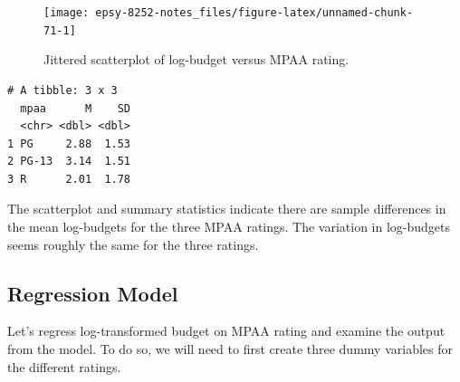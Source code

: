 \documentclass[]{book}
\newenvironment{Shaded}{\begin{snugshade}}{\end{snugshade}}
\newcommand{\CommentTok}[1]{\textcolor[rgb]{0.56,0.35,0.01}{\textit{#1}}}
\newcommand{\DataTypeTok}[1]{\textcolor[rgb]{0.13,0.29,0.53}{#1}}
\newcommand{\KeywordTok}[1]{\textcolor[rgb]{0.13,0.29,0.53}{\textbf{#1}}}
\newcommand{\NormalTok}[1]{#1}
\newcommand{\OperatorTok}[1]{\textcolor[rgb]{0.81,0.36,0.00}{\textbf{#1}}}
\newcommand{\StringTok}[1]{\textcolor[rgb]{0.31,0.60,0.02}{#1}}
\begin{document}
\begin{figure}

{\centering \texttt{[image: epsy-8252-notes\_files/figure-latex/unnamed-chunk-71-1]} 

}

\caption{Jittered scatterplot of log-budget versus MPAA rating.}\label{fig:unnamed-chunk-71}
\end{figure}

\begin{Shaded}
\end{Shaded}

\begin{verbatim}
# A tibble: 3 x 3
  mpaa      M    SD
  <chr> <dbl> <dbl>
1 PG     2.88  1.53
2 PG-13  3.14  1.51
3 R      2.01  1.78
\end{verbatim}

The scatterplot and summary statistics indicate there are sample differences in the mean log-budgets for the three MPAA ratings. The variation in log-budgets seems roughly the same for the three ratings.

\hypertarget{regression-model}{%
\subsection{Regression Model}\label{regression-model}}

Let's regress log-transformed budget on MPAA rating and examine the output from the model. To do so, we will need to first create three dummy variables for the different ratings.
\end{document}
